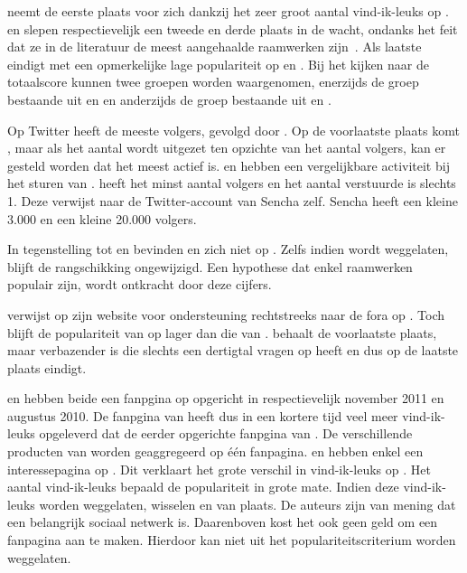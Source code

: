 \kendo{} neemt de eerste plaats voor zich dankzij het zeer groot aantal vind-ik-leuks op \fb.
\jqm{} en \st{} slepen respectievelijk een tweede en derde plaats in de wacht, ondanks het feit dat ze in de literatuur de meest aangehaalde raamwerken zijn~\cite{David2011,Firtman2013,Hales2012,Oeflman2011}. 
Als laatste eindigt \lungo{} met een opmerkelijke lage populariteit op \so{} en \fb.
Bij het kijken naar de totaalscore kunnen twee groepen worden waargenomen, enerzijds de groep bestaande uit \kendo{} en \jqm{} en anderzijds de groep bestaande uit \st{} en \lungo{}.

Op Twitter heeft \jqm{} de meeste volgers, gevolgd door \kendo.
Op de voorlaatste plaats komt \lungo{}, maar als het aantal  wordt uitgezet ten opzichte van het aantal volgers, kan er gesteld worden dat \lungo{} het meest actief is.
\jqm{} en \kendo{} hebben een vergelijkbare activiteit bij het sturen van .
\st{} heeft het minst aantal volgers en het aantal verstuurde  is slechts 1.
Deze  verwijst naar de Twitter-account van Sencha zelf.
Sencha heeft een kleine 3.000  en een kleine 20.000 volgers.

In tegenstelling tot \jqm{} en \lungo{} bevinden \kendo{} en \st{} zich niet op \gh{}.
Zelfs indien \gh{} wordt weggelaten, blijft de rangschikking ongewijzigd.
Een hypothese dat enkel  raamwerken populair zijn, wordt ontkracht door deze cijfers.

\kendo{} verwijst op zijn website voor ondersteuning rechtstreeks naar de fora op \so{}. 
Toch blijft de populariteit van \kendo{} op \so{} lager dan die van \jqm{}.
\st{} behaalt de voorlaatste plaats, maar verbazender is \lungo{} die slechts een dertigtal vragen op \so{} heeft en dus op de laatste plaats eindigt.

\kendo{} en \jqm{} hebben beide een fanpgina op \fb{} opgericht in respectievelijk november 2011 en augustus 2010.
De fanpgina van \kendo{} heeft dus in een kortere tijd veel meer vind-ik-leuks opgeleverd dat de eerder opgerichte fanpgina van \jqm{}.
De verschillende producten van \kendo{} worden geaggregeerd op één fanpagina. 
\st{} en \lungo{} hebben enkel een interessepagina op \fb.
Dit verklaart het grote verschil in vind-ik-leuks op \fb.
Het aantal vind-ik-leuks bepaald de populariteit in grote mate.
Indien deze vind-ik-leuks worden weggelaten, wisselen \jqm{} en \kendo{} van plaats.
De auteurs zijn van mening dat \fb{} een belangrijk sociaal netwerk is.
Daarenboven kost het ook geen geld om een fanpagina aan te maken.
Hierdoor kan \fb{} niet uit het populariteitscriterium worden weggelaten.  

